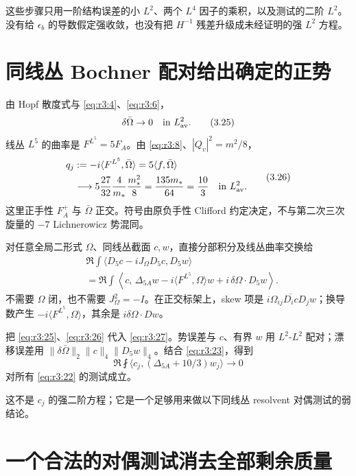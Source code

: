 \documentclass[UTF8,11pt,fontset=none]{ctexart}
\begin{document}
这些步骤只用一阶结构误差的小 \(L^2\)、两个 \(L^4\) 因子的乘积，以及测试的二阶 \(L^2\)。没有给 \(\epsilon_b\) 的导数假定强收敛，也没有把 \(H^{-1}\) 残差升级成未经证明的强 \(L^2\) 方程。

\section{同线丛 Bochner 配对给出确定的正势}\label{ch3:ux540cux7ebfux4e1b-bochner-ux914dux5bf9ux7ed9ux51faux786eux5b9aux7684ux6b63ux52bf}

由 Hopf 散度式与 \eqref{eq:r3:4}、\eqref{eq:r3:6}， \[
 \delta\bar\Omega\to0\quad\text{in }L^2_{\rm av}.
 \tag{3.25}\label{eq:r3:25}
\] 线丛 \(L^5\) 的曲率是 \(F^{L^5}=5F_A\)。由 \eqref{eq:r3:8}、\(|Q_v|^2=m^2/8\)， \[
 \begin{aligned}
 \mathfrak q_j&:=-i\langle F^{L^5},\bar\Omega\rangle
       =5\langle f,\bar\Omega\rangle\\
 &\longrightarrow
 5\frac{27}{32}\frac4{m_*}\frac{m_*^2}{8}
   =\frac{135m_*}{64}=\frac{10}{3}
 \quad\text{in }L^2_{\rm av}.
 \end{aligned}
 \tag{3.26}\label{eq:r3:26}
\] 这里正手性 \(F_A^+\) 与 \(\bar\Omega\) 正交。符号由原负手性 Clifford 约定决定，不与第二次三次旋量的 \(-7\) Lichnerowicz 势混同。

对任意全局二形式 \(\Omega\)、同线丛截面 \(c,w\)，直接分部积分及线丛曲率交换给 \[
 \begin{aligned}
 &\Re\int\langle D_5c-iJ_\Omega D_5c,D_5w\rangle\\
 &=\Re\int\left\langle c,\,
    \Delta_{5A}w-i\langle F^{L^5},\Omega\rangle w
                         +i\,\delta\Omega\cdot D_5w\right\rangle.
 \end{aligned}
 \tag{3.27}\label{eq:r3:27}
\] 不需要 \(\Omega\) 闭，也不需要 \(J_\Omega^2=-I\)。在正交标架上，skew 项是 \(i\Omega_{ij}\overline{D_i c}D_jw\)；换导数产生 \(-i\langle F^{L^5},\Omega\rangle\)，其余是 \(i\delta\Omega\cdot Dw\)。

把 \eqref{eq:r3:25}、\eqref{eq:r3:26} 代入 \eqref{eq:r3:27}。势误差与 \(c\)、有界 \(w\) 用 \(L^2\)-\(L^2\) 配对；漂移误差用 \(\|\delta\bar\Omega\|_2\|c\|_4\|D_5w\|_4\)。结合 \eqref{eq:r3:23}，得到 \[
 \boxed{\Re\fint\langle c_j,(\Delta_{5A}+10/3)w_j\rangle\to0}
 \tag{3.28}\label{eq:r3:28}
\] 对所有 \eqref{eq:r3:22} 的测试成立。

这不是 \(c_j\) 的强二阶方程；它是一个足够用来做以下同线丛 resolvent 对偶测试的弱结论。

\section{一个合法的对偶测试消去全部剩余质量}\label{ch3:ux4e00ux4e2aux5408ux6cd5ux7684ux5bf9ux5076ux6d4bux8bd5ux6d88ux53bbux5168ux90e8ux5269ux4f59ux8d28ux91cf}
\end{document}
